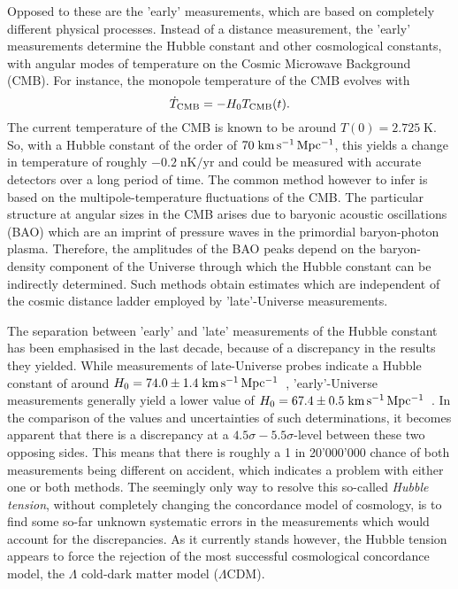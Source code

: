 Opposed to these are the 'early' measurements, which are based on completely
different physical processes.  Instead of a distance measurement, the 'early'
measurements determine the Hubble constant and other cosmological constants,
with angular modes of temperature on the Cosmic Microwave Background (CMB).  For
instance, the monopole temperature of the CMB evolves with
%
\begin{equation}
    \dot{T}_{\text{CMB}} = -H_{0}{}T_{\text{CMB}}(t).
\end{equation}
The current temperature of the CMB is known to be around $T(0) =
2.725\;\mathrm{K}$. So, with a Hubble constant of the order of
$70\;\mathrm{km\,s^{-1}\,Mpc^{-1}}{}$, this yields a change in temperature of roughly
$-0.2\;\mathrm{nK/yr}$ and could be measured with accurate detectors over a long
period of time.  The common method however to infer \Ho{} is based on the
multipole-temperature fluctuations of the CMB.  The particular structure at
angular sizes in the CMB arises due to baryonic acoustic oscillations (BAO)
which are an imprint of pressure waves in the primordial baryon-photon plasma.
Therefore, the amplitudes of the BAO peaks depend on the baryon-density
component of the Universe through which the Hubble constant can be indirectly
determined.  Such methods obtain estimates which are independent of the cosmic
distance ladder employed by 'late'-Universe measurements.

The separation between 'early' and 'late' measurements of the Hubble constant
has been emphasised in the last decade, because of a discrepancy in the results
they yielded.  While measurements of late-Universe probes indicate a Hubble
constant of around $H_{0} = 74.0 \pm 1.4\;\mathrm{km\,s^{-1}\,Mpc^{-1}}$~, 'early'-Universe
measurements generally yield a lower value of $H_{0} = 67.4 \pm
0.5\;\mathrm{km\,s^{-1}\,Mpc^{-1}}$~.  In the comparison of the
values and uncertainties of such determinations, it becomes apparent that there
is a discrepancy at a $4.5\sigma-5.5\sigma$-level between these two opposing sides.  This means
that there is roughly a 1 in 20'000'000 chance of both measurements being
different on accident, which indicates a problem with either one or both
methods.  The seemingly only way to resolve this so-called \textit{Hubble
tension}, without completely changing the concordance model of cosmology, is to
find some so-far unknown systematic errors in the measurements which would
account for the discrepancies.  As it currently stands however, the Hubble
tension appears to force the rejection of the most successful cosmological
concordance model, the $\Lambda$ cold-dark matter model ($\Lambda$CDM). 


